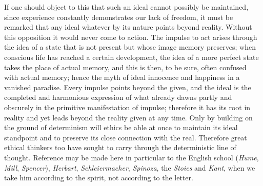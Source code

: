 \documentclass[12pt,a4paper,openany]{book}
\newcommand{\opage}[1]{\marginnote{\footnotesize\textit{[#1]}}}
\begin{document}
\opage{136}If one should object to this that such an ideal cannot possibly
be maintained, since experience constantly demonstrates our lack of freedom,
it must be remarked that any ideal whatever by its nature points beyond
reality. Without this opposition it would never come to action. The impulse
to act arises through the idea of a state that is not present but whose
image memory preserves; when conscious life has reached a certain
development, the idea of a more perfect state takes the place of actual
memory, and this is then, to be sure, often confused with actual memory;
hence the myth of ideal innocence and happiness in a vanished paradise.
Every impulse points beyond the given, and the ideal is the completed and
harmonious expression of what already dawns partly and obscurely in the
primitive manifestation of impulse; therefore it has its root in reality and
yet leads beyond the reality given at any time. Only by building on the
ground of determinism will ethics be able at once to maintain its ideal
standpoint and to preserve its close connection with the real. Therefore
great ethical thinkers too have sought to carry through the deterministic
line of thought. Reference may be made here in particular to the English
school (\emph{Hume}, \emph{Mill}, \emph{Spencer}), \emph{Herbart},
\emph{Schleiermacher}, \emph{Spinoza}, the \emph{Stoics} and \emph{Kant},
when we take him according to the spirit, not according to the letter.
\end{document}
